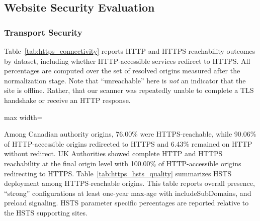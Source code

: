 \documentclass[conference]{IEEEtran}
\begin{document}
\subsection{Website Security Evaluation}

\subsubsection{Transport Security}

Table~\ref{tab:https_connectivity} reports HTTP and HTTPS reachability outcomes by dataset, including whether HTTP-accessible services redirect to HTTPS.
All percentages are computed over the set of resolved origins measured after the normalization stage. Note that ``unreachable'' here is \emph{not} 
an indicator that the site is offline. Rather, that our scanner was repeatedly unable to complete a TLS handshake or receive an HTTP response.

\begin{table}[t]
  \caption{HTTP/HTTPS connectivity outcomes by dataset (percent of origins).}
  \label{tab:https_connectivity}
  \centering
  \scriptsize
  \setlength{\tabcolsep}{3pt}
  \renewcommand{\arraystretch}{1.15}
  
  \begin{adjustbox}{max width=\columnwidth}
  \end{adjustbox}
  \end{table}
  
Among Canadian authority origins, 76.00\% were HTTPS-reachable, while 90.06\% of HTTP-accessible origins redirected to HTTPS and 6.43\% remained on HTTP without redirect.
UK Authorities showed complete HTTP and HTTPS reachability at the final origin level with 100.00\% of HTTP-accessible origins redirecting to HTTPS. 
Table~\ref{tab:https_hsts_quality} summarizes HSTS deployment among HTTPS-reachable origins. 
This table reports overall presence, ``strong'' configurations at least one-year max-age with includeSubDomains, and preload signaling. HSTS 
parameter specific percentages are reported relative to the HSTS supporting sites.
\end{document}
